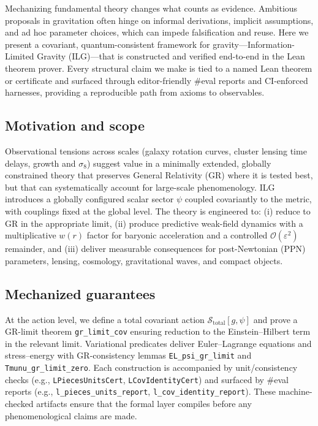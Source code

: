 \documentclass[aps,prd,twocolumn,superscriptaddress,nofootinbib,floatfix,longbibliography]{revtex4-2}
\newcommand{\Order}{\mathcal{O}}
\newcommand{\Action}{\mathcal{S}}
\newcommand{\lean}[1]{\texttt{#1}}
\begin{document}
Mechanizing fundamental theory changes what counts as evidence. Ambitious proposals in gravitation often hinge on informal derivations, implicit assumptions, and ad hoc parameter choices, which can impede falsification and reuse. Here we present a covariant, quantum-consistent framework for gravity---Information-Limited Gravity (ILG)---that is constructed and verified end-to-end in the Lean theorem prover. Every structural claim we make is tied to a named Lean theorem or certificate and surfaced through editor-friendly \#eval reports and CI-enforced harnesses, providing a reproducible path from axioms to observables.

\subsection{Motivation and scope}
Observational tensions across scales (galaxy rotation curves, cluster lensing time delays, growth and $\sigma_8$) suggest value in a minimally extended, globally constrained theory that preserves General Relativity (GR) where it is tested best, but that can systematically account for large-scale phenomenology. ILG introduces a globally configured scalar sector $\psi$ coupled covariantly to the metric, with couplings fixed at the global level. The theory is engineered to: (i) reduce to GR in the appropriate limit, (ii) produce predictive weak-field dynamics with a multiplicative $w(r)$ factor for baryonic acceleration and a controlled $\Order(\varepsilon^2)$ remainder, and (iii) deliver measurable consequences for post-Newtonian (PPN) parameters, lensing, cosmology, gravitational waves, and compact objects.

\subsection{Mechanized guarantees}
At the action level, we define a total covariant action $\Action_{\mathrm{total}}[g,\psi]$ and prove a GR-limit theorem \lean{gr_limit_cov} ensuring reduction to the Einstein--Hilbert term in the relevant limit. Variational predicates deliver Euler--Lagrange equations and stress--energy with GR-consistency lemmas \lean{EL_psi_gr_limit} and \lean{Tmunu_gr_limit_zero}. Each construction is accompanied by unit/consistency checks (e.g., \lean{LPiecesUnitsCert}, \lean{LCovIdentityCert}) and surfaced by \#eval reports (e.g., \lean{l_pieces_units_report}, \lean{l_cov_identity_report}). These machine-checked artifacts ensure that the formal layer compiles before any phenomenological claims are made.
\end{document}
